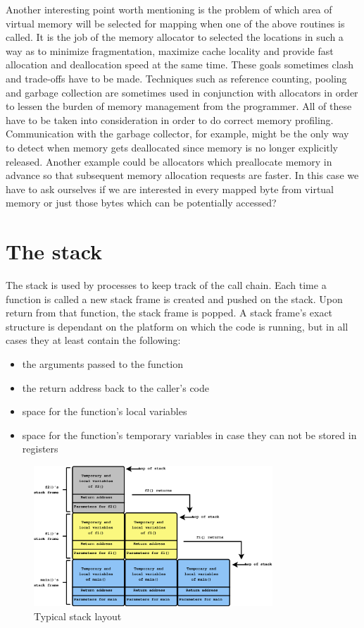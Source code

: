 Another interesting point worth mentioning is the problem of which area of virtual memory will be selected for mapping when one of the above routines is called. It is the job of the memory allocator to selected the locations in such a way as to minimize fragmentation, maximize cache locality and provide fast allocation and deallocation speed at the same time. These goals sometimes clash and trade-offs have to be made. Techniques such as reference counting, pooling and garbage collection are sometimes used in conjunction with allocators in order to lessen the burden of memory management from the programmer. All of these have to
be taken into consideration in order to do correct memory profiling. Communication with the garbage collector, for example, might be the only way to detect when memory gets deallocated since memory is no longer explicitly released. Another example could be allocators which preallocate memory in advance so that subsequent memory allocation requests are faster. In this case we have to ask ourselves if we are interested in every mapped byte from virtual memory or just those bytes which can be potentially accessed?

\section{The stack}
\label{section:stack}

The stack is used by processes to keep track of the call chain. Each time a function is called a new stack frame is created and pushed on the stack. Upon return from that function, the stack frame is popped. A stack frame's exact structure is dependant on the platform on which the code is running, but in all cases they at least contain the following:

\begin{itemize}
\item the arguments passed to the function
\item the return address back to the caller's code
\item space for the function's local variables
\item space for the function's temporary variables in case they can not be stored in registers
\end{itemize}

\begin{figure}[htb]
\centering
\includegraphics[width=0.8\textwidth]{src/img/stacklayout}
\caption{Typical stack layout}
\label{fig:stacklayout}
\end{figure}

